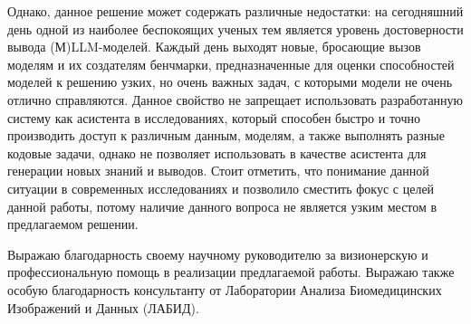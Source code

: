 Однако, данное решение может содержать различные недостатки: на сегодняшний день одной из наиболее беспокоящих
ученых тем является уровень достоверности вывода (М)LLM-моделей. Каждый день выходят новые, бросающие вызов
моделям и их создателям бенчмарки, предназначенные для оценки способностей моделей к решению узких, но очень
важных задач, с которыми модели не очень отлично справляются. Данное свойство не запрещает использовать 
разработанную систему как асистента в исследованиях, который способен быстро и точно производить доступ
к различным данным, моделям, а также выполнять разные кодовые задачи, однако не позволяет использовать в 
качестве асистента для генерации новых знаний и выводов. Стоит отметить, что понимание данной ситуации в 
современных исследованиях и позволило сместить фокус с целей данной работы, потому наличие данного вопроса
не является узким местом в предлагаемом решении.     

Выражаю благодарность своему научному руководителю за визионерскую и профессиональную помощь
в реализации предлагаемой работы. Выражаю также особую благодарность консультанту от 
Лаборатории Анализа Биомедицинских Изображений и Данных (ЛАБИД).

